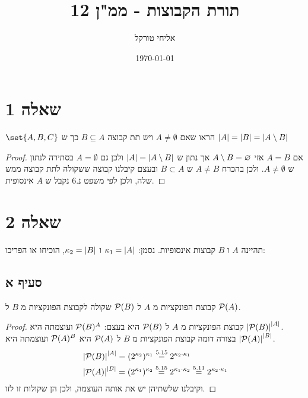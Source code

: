 \documentclass{article}
\title{תורת הקבוצות - ממ"ן 12}
\author{אליחי טורקל \ID}
\date\today
\DeclarePairedDelimiter\set\{\}
\begin{document}
	\maketitle %


	\section*{שאלה 1}
	$\set{A,B,C}$
	הראו שאם $A \neq \emptyset$ ויש תת קבוצה $B \subseteq A$ כך ש $\left| A \right| = \left| B \right| = \left| A \setminus B \right|$
	\begin{proof}
		אם $A = B$ אזי $A \setminus B = \varnothing$ אך נתון ש $\left| A \right| = \left| A \setminus B \right|$ ולכן גם $A = \emptyset$ בסתירה לנתון ש $A \neq \emptyset$.
		ולכן בהכרח $A \neq B$ ש $B \subset A$ ובעצם קיבלנו קבוצה ששקולה לתת קבוצה ממש שלה, ולכן לפי משפט נ.6 נקבל ש $A$ אינסופית.
	\end{proof}

	\section*{שאלה 2}
	תהיינה $A$ ו $B$ קבוצות אינסופיות. נסמן: ${\kappa_1} = \left| A \right|$ ו ${\kappa_2} = \left| B \right|$, הוכיחו או הפריכו:

	\subsection*{סעיף א}
	קבוצת הפונקציות מ $A$ ל $\mathcal{P}(B)$ שקולה לקבוצת הפונקציות מ $B$ ל $\mathcal{P}(A)$.
	\begin{proof}
		קבוצת הפונקציות מ $A$ ל $\mathcal{P}(B)$ היא בעצם: $\mathcal{P}(B)^A$ ועוצמתה היא $\left| \mathcal{P}(B) \right|^{\left| A \right|}$. \\
		בצורה דומה קבוצת הפונקציות מ $B$ ל $\mathcal{P}(A)$ היא $\mathcal{P}(A)^B$ ועוצמתה היא $\left| \mathcal{P}(A) \right|^{\left| B \right|}$.
		\begin{align*}
			&\left| \mathcal{P}(B) \right|^{\left| A \right|} = (2^{\kappa_2})^{\kappa_1} \overset{5.15}= 2^{{\kappa_2} \cdot {\kappa_1}} \\
			&\left| \mathcal{P}(A) \right|^{\left| B \right|} = (2^{\kappa_1})^{\kappa_2} \overset{5.15}= 2^{{\kappa_1} \cdot {\kappa_2}} \overset{5.11}= 2^{{\kappa_2} \cdot {\kappa_1}}
		\end{align*}
		וקיבלנו שלשתיהן יש את אותה העוצמה, ולכן הן שקולות זו לזו.
	\end{proof}
\end{document}

